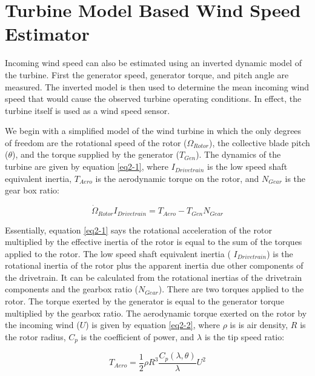 
\section{Turbine Model Based Wind Speed Estimator} \label{section2-4} 

Incoming wind speed can also be estimated using an inverted dynamic model of the turbine.  First the generator speed, generator torque, and pitch angle are measured.  The inverted model is then used to determine the mean incoming wind speed that would cause the observed turbine operating conditions.  In effect, the turbine itself is used as a wind speed sensor. \cite{ostergaard2007,vanderhooft2004,schlipf2014}

We begin with a simplified model of the wind turbine in which the only degrees of freedom are the rotational speed of the rotor ($\Omega _{Rotor}$), the collective blade pitch ($\theta$), and the torque supplied by the generator ($T_{Gen}$).  The dynamics of the turbine are given by equation \ref{eq2-1}, where $I_{Drivetrain}$ is the low speed shaft equivalent inertia, $T_{Aero}$ is the aerodynamic torque on the rotor, and $N_{Gear}$ is the gear box ratio:

\begin{equation}
	\dot{\Omega }_{Rotor}I_{Drivetrain}=T_{Aero}-T_{Gen}N_{Gear} \label{eq2-1}
\end{equation}

Essentially, equation  \ref{eq2-1} says the rotational acceleration of the rotor multiplied by the effective inertia of the rotor is equal to the sum of the torques applied to the rotor. The low speed shaft equivalent inertia ( $I_{Drivetrain}$) is the rotational inertia of the rotor plus the apparent inertia due other components of the drivetrain. It can be calculated from the rotational inertias of the drivetrain components and the gearbox ratio ($N_{Gear}$). There are two torques applied to the rotor. The torque exerted by the generator is equal to the generator torque multiplied by the gearbox ratio. The aerodynamic torque exerted on the rotor by the incoming wind ($U$) is given by equation \ref{eq2-2}, where $\rho$ is is air density, $R$ is the rotor radius, $C_p$ is the coefficient of power, and $\lambda$ is the tip speed ratio:

\begin{equation}
	T_{Aero}=\frac{1}{2}\rho R^{3}\frac{C_{p}(\lambda,\theta)}{\lambda}U^{2} \label{eq2-2}
\end{equation}

